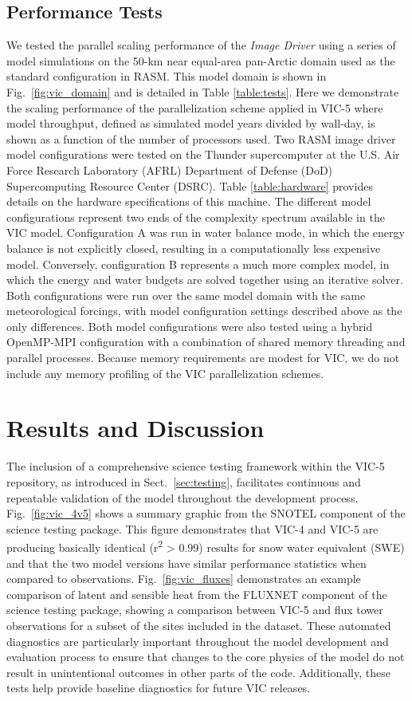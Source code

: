 \documentclass[gmd, manuscript]{copernicus}
\begin{document}
    \subsection{Performance Tests}

    We tested the parallel scaling performance of the \textit{Image Driver} using a series of model simulations on the 50-km near equal-area pan-Arctic domain used as the standard configuration in RASM. This model domain is shown in Fig.~\ref{fig:vic_domain} and is detailed in Table \ref{table:tests}. Here we demonstrate the scaling performance of the parallelization scheme applied in VIC-5 where model throughput, defined as simulated model years divided by wall-day, is shown as a function of the number of processors used. Two RASM image driver model configurations were tested on the Thunder supercomputer at the U.S. Air Force Research Laboratory (AFRL) Department of Defense (DoD) Supercomputing Resource Center (DSRC). Table \ref{table:hardware} provides details on the hardware specifications of this machine. The different model configurations represent two ends of the complexity spectrum available in the VIC model. Configuration A was run in water balance mode, in which the energy balance is not explicitly closed, resulting in a computationally less expensive model. Conversely, configuration B represents a much more complex model, in which the energy and water budgets are solved together using an iterative solver. Both configurations were run over the same model domain with the same meteorological forcings, with model configuration settings described above as the only differences. Both model configurations were also tested using a hybrid OpenMP-MPI configuration with a combination of shared memory threading and parallel processes. Because memory requirements are modest for VIC, we do not include any memory profiling of the VIC parallelization schemes.

\section{Results and Discussion}
  \label{sec:results}
  The inclusion of a comprehensive science testing framework within the VIC-5 repository, as introduced in Sect.~\ref{sec:testing}, facilitates continuous and repeatable validation of the model throughout the development process. Fig.~\ref{fig:vic_4v5} shows a summary graphic from the SNOTEL component of the science testing package. This figure demonstrates that VIC-4 and VIC-5 are producing basically identical (r\textsuperscript{2} > 0.99) results for snow water equivalent (SWE) and that the two model versions have similar performance statistics when compared to observations. Fig.~\ref{fig:vic_fluxes} demonstrates an example comparison of latent and sensible heat from the FLUXNET component of the science testing package, showing a comparison between VIC-5 and flux tower observations for a subset of the sites included in the dataset. These automated diagnostics are particularly important throughout the model development and evaluation process to ensure that changes to the core physics of the model do not result in unintentional outcomes in other parts of the code. Additionally, these tests help provide baseline diagnostics for future VIC releases.
\end{document}
